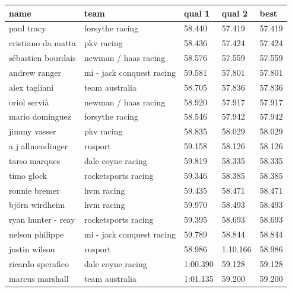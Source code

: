 \documentclass{article}
\begin{document}
\begin{tabular}{lllll}
\toprule
name & team & qual 1 & qual 2 & best \\
\midrule
paul tracy & forsythe racing & 58.440 & 57.419 & 57.419 \\
cristiano da matta & pkv racing & 58.436 & 57.424 & 57.424 \\
sébastien bourdais & newman / haas racing & 58.576 & 57.559 & 57.559 \\
andrew ranger & mi - jack conquest racing & 59.581 & 57.801 & 57.801 \\
alex tagliani & team australia & 58.705 & 57.836 & 57.836 \\
oriol servià & newman / haas racing & 58.920 & 57.917 & 57.917 \\
mario domínguez & forsythe racing & 58.546 & 57.942 & 57.942 \\
jimmy vasser & pkv racing & 58.835 & 58.029 & 58.029 \\
a j allmendinger & rusport & 59.158 & 58.126 & 58.126 \\
tarso marques & dale coyne racing & 59.819 & 58.335 & 58.335 \\
timo glock & rocketsports racing & 59.346 & 58.385 & 58.385 \\
ronnie bremer & hvm racing & 59.435 & 58.471 & 58.471 \\
björn wirdheim & hvm racing & 59.970 & 58.493 & 58.493 \\
ryan hunter - reay & rocketsports racing & 59.395 & 58.693 & 58.693 \\
nelson philippe & mi - jack conquest racing & 59.789 & 58.844 & 58.844 \\
justin wilson & rusport & 58.986 & 1:10.166 & 58.986 \\
ricardo sperafico & dale coyne racing & 1:00.390 & 59.128 & 59.128 \\
marcus marshall & team australia & 1:01.135 & 59.200 & 59.200 \\
\bottomrule
\end{tabular}
\end{document}
